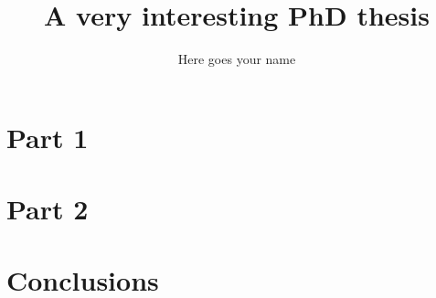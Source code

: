 \documentclass[a4paper]{uexthesis}
\author{Here goes your name}
\title{A very interesting PhD thesis}
\begin{document}
\sloppy

\InsertaPaginasIniciales


\newpage{\cleardoublepage}
\newpage{\cleardoublepage}
\newpage{\cleardoublepage}


\newpage{\ }
\newpage{\thispagestyle{headings}\cleardoublepage}


\setcounter{secnumdepth}{3}
\setcounter{tocdepth}{3}
\tableofcontents

\newpage{\thispagestyle{empty}\ }
\newpage{\thispagestyle{empty}\cleardoublepage}





\part{Part 1}\label{part1}
  
  
\part{Part 2}\label{part2}
  
  
\part{Conclusions}\label{conclusionsPart}
  
  
  

\newpage{\thispagestyle{empty}\cleardoublepage}
\printindex
\newpage{\thispagestyle{empty}\cleardoublepage}


\def\printbetweencitations{; }

\def\printbetweencitations{; }
\end{document}
